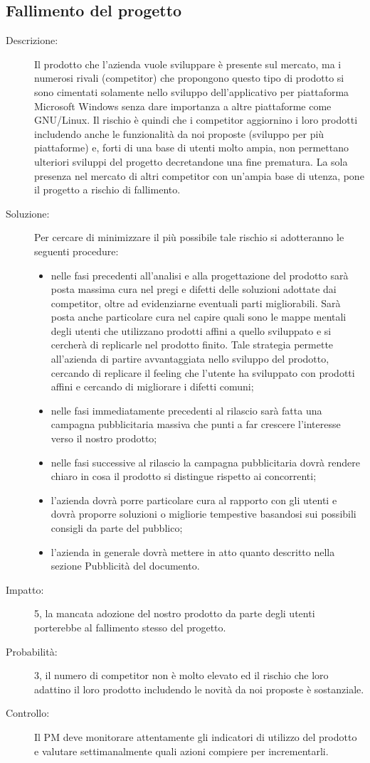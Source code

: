 \subsection{Fallimento del progetto}
\begin{description}
\item[Descrizione:] Il prodotto che l'azienda vuole sviluppare è presente sul mercato, ma i numerosi rivali (competitor) che propongono questo tipo di prodotto si sono cimentati solamente nello sviluppo dell'applicativo per piattaforma Microsoft Windows senza dare importanza a altre piattaforme come GNU/Linux.
Il rischio è quindi che i competitor aggiornino i loro prodotti includendo anche le
funzionalità da noi proposte (sviluppo per più piattaforme) e, forti di una base di utenti molto ampia, non permettano ulteriori sviluppi del progetto decretandone una fine prematura. La sola presenza nel mercato di altri competitor con un'ampia base di utenza, pone il progetto a rischio di fallimento.
\item[Soluzione:] Per cercare di minimizzare il più possibile tale rischio si adotteranno le
seguenti procedure:
	\begin{itemize}
	\item nelle fasi precedenti all'analisi e alla progettazione del prodotto sarà posta
	massima cura nel pregi e difetti delle soluzioni adottate dai competitor, oltre ad evidenziarne eventuali parti
	migliorabili. Sarà posta anche particolare cura nel capire quali sono le mappe mentali degli utenti che utilizzano prodotti affini a quello sviluppato e si cercherà di replicarle nel prodotto finito. Tale strategia permette all'azienda di partire avvantaggiata nello sviluppo del prodotto, cercando di replicare il feeling che l'utente ha sviluppato con prodotti affini e cercando di migliorare i difetti comuni;
	\item nelle fasi immediatamente precedenti al rilascio sarà fatta una campagna
	pubblicitaria massiva che punti a far crescere l'interesse verso il nostro prodotto;
	\item nelle fasi successive al rilascio la campagna pubblicitaria dovrà rendere chiaro
	in cosa il prodotto si distingue rispetto ai concorrenti;
	\item l'azienda dovrà porre particolare cura al rapporto con gli utenti e dovrà
	proporre soluzioni o migliorie tempestive basandosi sui possibili consigli da parte del pubblico;
	\item l'azienda in generale dovrà mettere in atto quanto descritto nella sezione Pubblicità del documento.
	\end{itemize}
\item[Impatto:] 5, la mancata adozione del nostro prodotto da parte degli utenti porterebbe
al fallimento stesso del progetto.
\item[Probabilità:] 3, il numero di competitor non è molto elevato ed il rischio che loro adattino
il loro prodotto includendo le novità da noi proposte è sostanziale. 
\item[Controllo:] Il PM deve monitorare attentamente gli indicatori di utilizzo del prodotto
e valutare settimanalmente quali azioni compiere per incrementarli.
\end{description}

